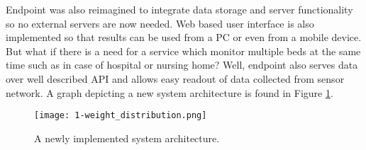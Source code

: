 Endpoint was also reimagined to integrate data storage and server functionality so no external servers are now needed. Web based user interface is also implemented so that results can be used from a \ac{PC} or even from a mobile device. But what if there is a need for a service which monitor multiple beds at the same time such as in case of hospital or nursing home? Well, endpoint also serves data over well described API and allows easy readout of data collected from sensor network. A graph depicting a new system architecture is found in Figure \ref{fig:sys_architecture}.

\begin{figure}[h]
  \begin{center}
    \texttt{[image: 1-weight\_distribution.png]}
  \end{center}
  \caption{A newly implemented system architecture.}
  \label{fig:sys_architecture}
\end{figure}